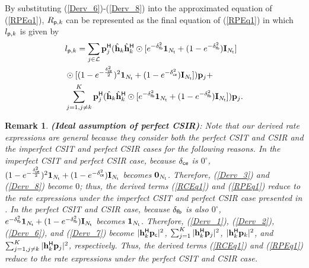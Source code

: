 \documentclass[draftclsnofoot, onecolumn, comsoc, 12pt]{IEEEtran}
\newtheorem{remark}{Remark}
\begin{document}
By substituting (\ref{Derv_6})-(\ref{Derv_8}) into the approximated equation of (\ref{RPEq1}), $R_{{\sf{p}},k}$ can be represented as the final equation of (\ref{RPEq1}) in which $l_{{\sf{p}},k}$ is given by
\begin{align}\label{lPEq}
& l_{{\sf{p}},k} = \sum\limits_{j \in \mathcal{L}} \mathbf{p}_{j}^{\sf{H}}(\hat{\mathbf{h}}_{k} \hat{\mathbf{h}}_{k}^{\sf{H}}\odot[e^{-\delta_{\sf{fb}}^{2}}\mathbf{1}_{N_{{\sf{t}}}} + (1-e^{-\delta_{\sf{fb}}^{2}})\mathbf{I}_{N_{{\sf{t}}}}] 
\nonumber \\
& \odot [(1-e^{-\frac{\delta_{\sf{ce}}^{2}}{2}})^{2}\mathbf{1}_{N_{{\sf{t}}}} + (1-e^{-\delta_{\sf{ce}}^{2}})\mathbf{I}_{N_{{\sf{t}}}}])\mathbf{p}_{j} + \nonumber \\
& \sum_{j=1, j \neq k}^{K} \mathbf{p}_{j}^{\sf{H}}(\hat{\mathbf{h}}_{k} \hat{\mathbf{h}}_{k}^{\sf{H}} \odot [e^{-\delta_{\sf{fb}}^{2}} \mathbf{1}_{N_{{\sf{t}}}} + (1-e^{-\delta_{\sf{fb}}^{2}})\mathbf{I}_{N_{{\sf{t}}}}])\mathbf{p}_{j}.
\end{align}
 \begin{remark} 
 {\rm \textbf{(Ideal assumption of  perfect CSIR)}:
  Note that our derived rate expressions are general because they consider both the perfect CSIT and CSIR and the imperfect CSIT and perfect CSIR cases for the following reasons. In the imperfect CSIT and perfect CSIR case, because 
$\delta_{\sf{ce}}$ is $0^{\circ}$, $(1-e^{-\frac{\delta_{\sf{ce}}^{2}}{2}})^{2}\mathbf{1}_{N_{{\sf{t}}}} + (1-e^{-\delta_{\sf{ce}}^{2}})\mathbf{I}_{N_{{\sf{t}}}}$ becomes $\mathbf{0}_{N_{{\sf{t}}}}$. 
Therefore, (\ref{Derv_3}) and (\ref{Derv_8}) become $0$; thus, the derived terms (\ref{RCEq1}) and (\ref{RPEq1}) reduce to the rate expressions under the imperfect CSIT and perfect CSIR case presented in \cite{yin2022rate}. In the perfect CSIT and CSIR case, because 
$\delta_{\sf{fb}}$ is also $0^{\circ}$, $e^{-\delta_{\sf{fb}}^{2}}\mathbf{1}_{N_{{\sf{t}}}} + (1-e^{-\delta_{\sf{fb}}^{2}})\mathbf{I}_{N_{{\sf{t}}}}$ becomes $ \mathbf{1}_{N_{{\sf{t}}}}$. Therefore, (\ref{Derv_1}), (\ref{Derv_2}), (\ref{Derv_6}), and (\ref{Derv_7}) become $\vert \mathbf{h}_{k}^{\sf{H}} \mathbf{p}_{\sf{c}} \vert^{2}$, $\sum_{j=1}^{K} \vert \mathbf{h}_{k}^{\sf{H}} \mathbf{p}_{j} \vert^{2}$, $\vert \mathbf{h}_{k}^{\sf{H}} \mathbf{p}_{k} \vert^{2}$, and $\sum_{j=1, j \neq k}^{K} \vert \mathbf{h}_{k}^{\sf{H}} \mathbf{p}_{j} \vert^{2}$, respectively. Thus, the derived terms (\ref{RCEq1}) and (\ref{RPEq1}) reduce to the rate expressions under the perfect CSIT and CSIR case. }
\end{remark} 
\end{document}
